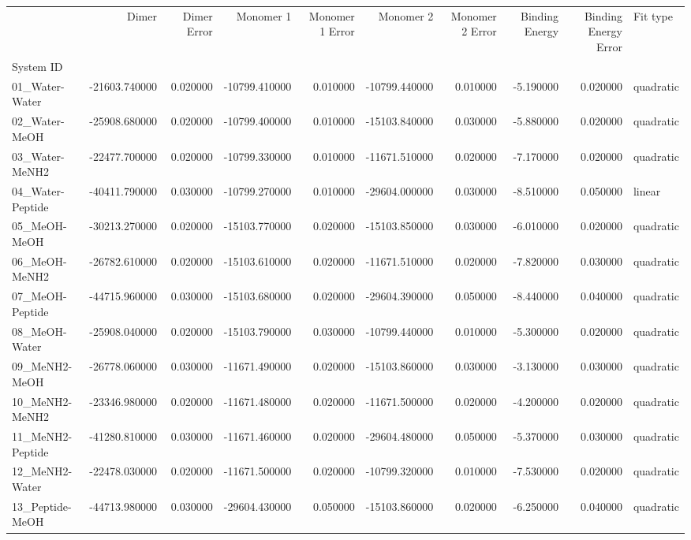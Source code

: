 \begin{tabular}{lrrrrrrrrl}
\toprule
 & Dimer & Dimer Error & Monomer 1 & Monomer 1 Error & Monomer 2 & Monomer 2 Error & Binding Energy & Binding Energy Error & Fit type \\
System ID &  &  &  &  &  &  &  &  &  \\
\midrule
01_Water-Water & -21603.740000 & 0.020000 & -10799.410000 & 0.010000 & -10799.440000 & 0.010000 & -5.190000 & 0.020000 & quadratic \\
02_Water-MeOH & -25908.680000 & 0.020000 & -10799.400000 & 0.010000 & -15103.840000 & 0.030000 & -5.880000 & 0.020000 & quadratic \\
03_Water-MeNH2 & -22477.700000 & 0.020000 & -10799.330000 & 0.010000 & -11671.510000 & 0.020000 & -7.170000 & 0.020000 & quadratic \\
04_Water-Peptide & -40411.790000 & 0.030000 & -10799.270000 & 0.010000 & -29604.000000 & 0.030000 & -8.510000 & 0.050000 & linear \\
05_MeOH-MeOH & -30213.270000 & 0.020000 & -15103.770000 & 0.020000 & -15103.850000 & 0.030000 & -6.010000 & 0.020000 & quadratic \\
06_MeOH-MeNH2 & -26782.610000 & 0.020000 & -15103.610000 & 0.020000 & -11671.510000 & 0.020000 & -7.820000 & 0.030000 & quadratic \\
07_MeOH-Peptide & -44715.960000 & 0.030000 & -15103.680000 & 0.020000 & -29604.390000 & 0.050000 & -8.440000 & 0.040000 & quadratic \\
08_MeOH-Water & -25908.040000 & 0.020000 & -15103.790000 & 0.030000 & -10799.440000 & 0.010000 & -5.300000 & 0.020000 & quadratic \\
09_MeNH2-MeOH & -26778.060000 & 0.030000 & -11671.490000 & 0.020000 & -15103.860000 & 0.030000 & -3.130000 & 0.030000 & quadratic \\
10_MeNH2-MeNH2 & -23346.980000 & 0.020000 & -11671.480000 & 0.020000 & -11671.500000 & 0.020000 & -4.200000 & 0.020000 & quadratic \\
11_MeNH2-Peptide & -41280.810000 & 0.030000 & -11671.460000 & 0.020000 & -29604.480000 & 0.050000 & -5.370000 & 0.030000 & quadratic \\
12_MeNH2-Water & -22478.030000 & 0.020000 & -11671.500000 & 0.020000 & -10799.320000 & 0.010000 & -7.530000 & 0.020000 & quadratic \\
13_Peptide-MeOH & -44713.980000 & 0.030000 & -29604.430000 & 0.050000 & -15103.860000 & 0.020000 & -6.250000 & 0.040000 & quadratic \\

\end{tabular}
